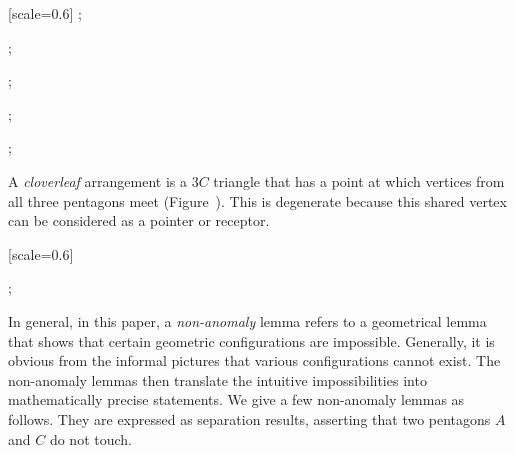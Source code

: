 {
[scale=0.6]
;
\begin{scope}[xshift=4.5cm,yshift=1.5cm]
;
\end{scope}
\begin{scope}[xshift=8cm]
;
\end{scope}
\begin{scope}[xshift=12cm]
;
\end{scope}
\begin{scope}[xshift=16cm]
;
\end{scope}
}





A {\it cloverleaf} arrangement is a $3C$ triangle that has a point at
which vertices from all three pentagons meet
(Figure~).  This is degenerate because this shared
vertex can be considered as a pointer or receptor.

{
[scale=0.6]
\begin{scope}[xshift=4cm]
;
\end{scope}
}

In general, in this paper, a {\it non-anomaly} lemma refers to a
geometrical lemma that shows that certain geometric configurations are
impossible.  Generally, it is obvious from the informal pictures that
various configurations cannot exist.  The non-anomaly lemmas then
translate the intuitive impossibilities into mathematically precise
statements.  We give a few non-anomaly lemmas as follows.
They are expressed as separation results, asserting that
two pentagons $A$ and $C$ do not touch.

